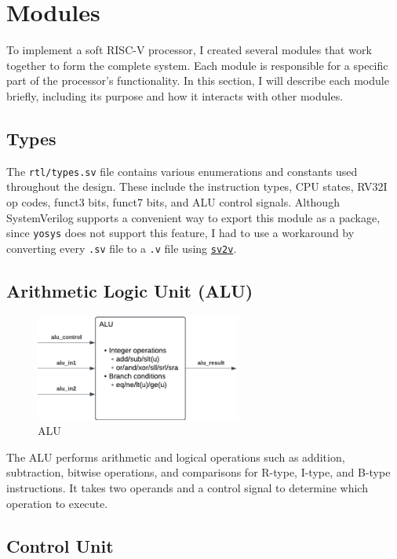 \section{Modules}

To implement a soft RISC-V processor, I created several modules that work together to form the complete system.
Each module is responsible for a specific part of the processor's functionality.
In this section, I will describe each module briefly, including its purpose and how it interacts with other modules.

\subsection{Types}

The \texttt{rtl/types.sv} file contains various enumerations and constants used throughout the design.
These include the instruction types, CPU states, RV32I op codes, funct3 bits, funct7 bits, and ALU control signals.
Although SystemVerilog supports a convenient way to export this module as a package, since \texttt{yosys} does not support this feature, I had to use a workaround by converting every \texttt{.sv} file to a \texttt{.v} file using
\href{https://github.com/zachjs/sv2v}{\texttt{sv2v}}.


\subsection{Arithmetic Logic Unit (ALU)}

\begin{figure}[H]
    \centering
    \includegraphics[width=0.6\textwidth]{media/alu}
    \caption{ALU}
    \label{fig:alu}
\end{figure}

The ALU performs arithmetic and logical operations such as addition, subtraction, bitwise operations, and comparisons for R-type, I-type, and B-type instructions.
It takes two operands and a control signal to determine which operation to execute.

\subsection{Control Unit}

